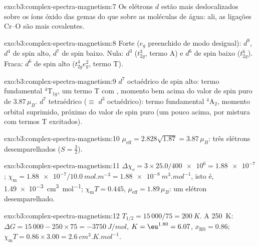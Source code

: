 \begin{solution}{exo:b3:complex-spectra-magnetism:7}
Os elétrons $d$ estão mais deslocalizados sobre os íons óxido das gemas do que sobre
as moléculas de água: ali, as ligações Cr--O são mais covalentes.
\end{solution}

\begin{solution}{exo:b3:complex-spectra-magnetism:8}
Forte ($e_g$ preenchido de modo desigual): $d^9$, $d^4$ de spin alto, $d^7$ de spin baixo. Nula: $d^3$ ($t_{2g}^3$, termo A) e
$d^6$ de spin baixo ($t_{2g}^6$). Fraca: $d^6$ de spin alto ($t_{2g}^4e_g^2$, termo T).
\end{solution}

\begin{solution}{exo:b3:complex-spectra-magnetism:9}
$d^7$ octaédrico de spin alto: termo fundamental $^4$T$_{1g}$, um termo T com ,
momento bem acima do valor de spin puro de $3.87\,\mu_B$. $d^7$ tetraédrico ($\equiv$ $d^3$ octaédrico): termo
fundamental $^4$A$_2$, momento orbital suprimido, próximo do valor de spin puro (um pouco acima, por
mistura com termos T excitados).
\end{solution}

\begin{solution}{exo:b3:complex-spectra-magnetism:10}
$\mu_{\mathrm{eff}} = 2.828\sqrt{1.87} = 3.87\,\mu_B$: três elétrons desemparelhados ($S = \frac32$).
\end{solution}

\begin{solution}{exo:b3:complex-spectra-magnetism:11}
$\Delta\chi_v = 3 \times 25.0/\num{400e6} = \num{1.88e-7}$; $\chi_{\mathrm m} = \num{1.88e-7}/\qty{10.0}{mol.m^{-3}} = \qty{1.88e-8}{m^3.mol^{-1}}$, isto é,
\qty{1.49e-3}{cm^3.mol^{-1}}; $\chi_{\mathrm m}T = 0.445$, $\mu_{\mathrm{eff}} = 1.89\,\mu_B$: um elétron desemparelhado.
\end{solution}

\begin{solution}{exo:b3:complex-spectra-magnetism:12}
$T_{1/2} = 15\,000/75 = \qty{200}{K}$. A \qty{250}{K}: $\Delta G = 15\,000 - 250 \times 75 = \qty{-3750}{J/mol}$, $K = \eu^{1.80} = 6.07$,
$x_{\mathrm{HS}} = 0.86$; $\chi_{\mathrm m}T = 0.86 \times 3.00 = \qty{2.6}{cm^3.K.mol^{-1}}$.
\end{solution}

